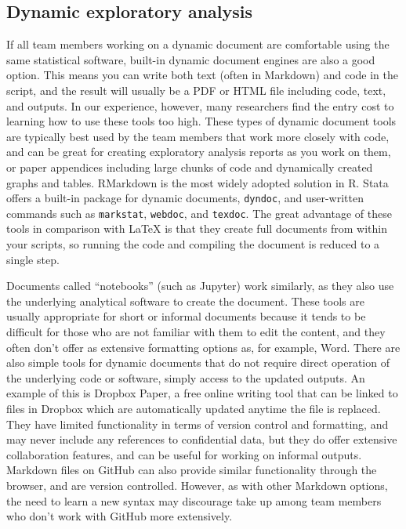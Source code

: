 \subsection{Dynamic exploratory analysis}	

If all team members working on a dynamic document are comfortable using the same statistical software,
built-in dynamic document engines are also a good option.
This means you can write both text (often in Markdown) and code in the script,
and the result will usually be a PDF or HTML file including code, text, and outputs.
In our experience, however, many researchers find the entry cost to learning how to use these tools too high.
These types of dynamic document tools are typically best used by the team members that work more closely with code,
and can be great for creating exploratory analysis reports as you work on them, 
or paper appendices including large chunks of code and dynamically created graphs and tables.
RMarkdown is the most widely adopted solution in R.
Stata offers a built-in package for dynamic documents, \texttt{dyndoc}, 
and user-written commands such as \texttt{markstat},
\texttt{webdoc}, and
\texttt{texdoc}.
The great advantage of these tools in comparison with LaTeX is that 
they create full documents from within your scripts, 
so running the code and compiling the document is reduced to a single step.

Documents called ``notebooks'' (such as Jupyter) work similarly,
as they also use the underlying analytical software to create the document.
These tools are usually appropriate for short or informal documents
because it tends to be difficult for those who are not familiar with them to edit the content,
and they often don't offer as extensive formatting options as, for example, Word.
There are also simple tools for dynamic documents
that do not require direct operation of the underlying code or software,
simply access to the updated outputs.
An example of this is Dropbox Paper,
a free online writing tool that can be linked to files in Dropbox
which are automatically updated anytime the file is replaced.
They have limited functionality in terms of version control and formatting,
and may never include any references to confidential data,
but they do offer extensive collaboration features, 
and can be useful for working on informal outputs. 
Markdown files on GitHub can also provide similar functionality through the browser,
and are version controlled.
However, as with other Markdown options, the need to learn a new syntax may
discourage take up among team members who don't work with GitHub more extensively.


